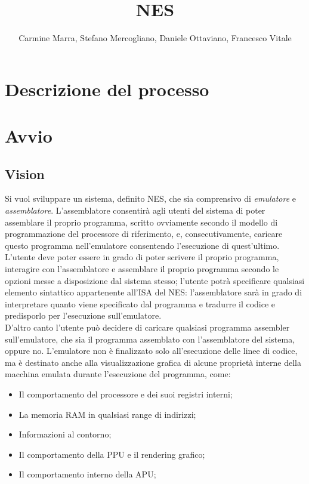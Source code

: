 \documentclass[11pt]{article}
\begin{document}
\title{NES}
\author{Carmine Marra, Stefano Mercogliano, Daniele Ottaviano, Francesco Vitale}
\date{}
\maketitle
\tableofcontents
\clearpage
\section{Descrizione del processo}

\section{Avvio}
\subsection{Vision}
Si vuol sviluppare un sistema, definito NES, che sia comprensivo di \emph{emulatore} e \emph{assemblatore}. L'assemblatore consentirà agli utenti del sistema di poter assemblare il proprio programma, scritto ovviamente secondo il modello di programmazione del processore di riferimento, e, consecutivamente, caricare questo programma nell'emulatore consentendo l'esecuzione di quest'ultimo.\\
L'utente deve poter essere in grado di poter scrivere il proprio programma, interagire con l'assemblatore e assemblare il proprio programma secondo le opzioni messe a disposizione dal sistema stesso; l'utente potrà specificare qualsiasi elemento sintattico appartenente all'ISA del NES: l'assemblatore sarà in grado di interpretare quanto viene specificato dal programma e tradurre il codice e predisporlo per l'esecuzione sull'emulatore.\\
D'altro canto l'utente può decidere di caricare qualsiasi programma assembler sull'emulatore, che sia il programma assemblato con l'assemblatore del sistema, oppure no. L'emulatore non è finalizzato solo all'esecuzione delle linee di codice, ma è destinato anche alla visualizzazione grafica di alcune proprietà interne della macchina emulata durante l'esecuzione del programma, come:
\begin{itemize}
	\item{
		Il comportamento del processore e dei suoi registri interni;
	}
	\item{
		La memoria RAM in qualsiasi range di indirizzi;
	}
	\item{
		Informazioni al contorno;
	}
	\item{
		Il comportamento della PPU e il rendering grafico;
	}
	\item{
		Il comportamento interno della APU;
	}
\end{itemize}
\clearpage
\end{document}
